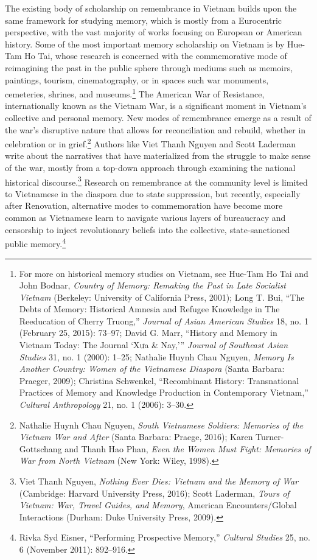 The existing body of scholarship on remembrance in Vietnam builds upon the same framework for studying memory, which is mostly from a Eurocentric perspective, with the vast majority of works focusing on European or American history. Some of the most important memory scholarship on Vietnam is by Hue-Tam Ho Tai, whose research is concerned with the commemorative mode of reimagining the past in the public sphere through mediums such as memoirs, paintings, tourism, cinematography, or in spaces such war monuments, cemeteries, shrines, and museums.\footnote{For more on historical memory studies on Vietnam, see Hue-Tam Ho Tai and John Bodnar, \textit{Country of Memory: Remaking the Past in Late Socialist Vietnam} (Berkeley: University of California Press, 2001); Long T. Bui, “The Debts of Memory: Historical Amnesia and Refugee Knowledge in The Reeducation of Cherry Truong,” \textit{Journal of Asian American Studies} 18, no. 1 (February 25, 2015): 73–97; David G. Marr, “History and Memory in Vietnam Today: The Journal ‘Xưa \& Nay,’” \textit{Journal of Southeast Asian Studies} 31, no. 1 (2000): 1–25; Nathalie Huynh Chau Nguyen, \textit{Memory Is Another Country: Women of the Vietnamese Diaspora} (Santa Barbara: Praeger, 2009); Christina Schwenkel, “Recombinant History: Transnational Practices of Memory and Knowledge Production in Contemporary Vietnam,” \textit{Cultural Anthropology} 21, no. 1 (2006): 3–30.} The American War of Resistance, internationally known as the Vietnam War, is a significant moment in Vietnam’s collective and personal memory. New modes of remembrance emerge as a result of the war’s disruptive nature that allows for reconciliation and rebuild, whether in celebration or in grief.\footnote{Nathalie Huynh Chau Nguyen, \textit{South Vietnamese Soldiers: Memories of the Vietnam War and After} (Santa Barbara: Praege, 2016); Karen Turner-Gottschang and Thanh Hao Phan, \textit{Even the Women Must Fight: Memories of War from North Vietnam} (New York: Wiley, 1998).} Authors like Viet Thanh Nguyen and Scott Laderman write about the narratives that have materialized from the struggle to make sense of the war, mostly from a top-down approach through examining the national historical discourse.\footnote{Viet Thanh Nguyen, \textit{Nothing Ever Dies: Vietnam and the Memory of War} (Cambridge: Harvard University Press, 2016); Scott Laderman, \textit{Tours of Vietnam: War, Travel Guides, and Memory}, American Encounters/Global Interactions (Durham: Duke University Press, 2009).} Research on remembrance at the community level is limited to Vietnamese in the diaspora due to state suppression, but recently, especially after Renovation, alternative modes to commemoration have become more common as Vietnamese learn to navigate various layers of bureaucracy and censorship to inject revolutionary beliefs into the collective, state-sanctioned public memory.\footnote{Rivka Syd Eisner, “Performing Prospective Memory,” \textit{Cultural Studies} 25, no. 6 (November 2011): 892–916.}

